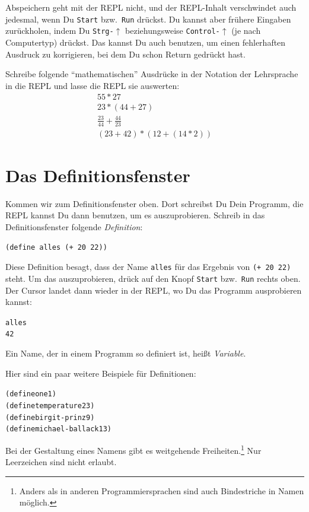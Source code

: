Abspeichern geht mit der REPL nicht, und der REPL-Inhalt verschwindet
auch jedesmal, wenn Du \texttt{Start} bzw.\ \texttt{Run} drückst.  Du
kannst aber frühere Eingaben zurückholen, indem Du
\texttt{Strg-$\uparrow$} beziehungsweise \texttt{Control-$\uparrow$}
(je nach Computertyp) drückst.  Das kannst Du auch benutzen, um einen
fehlerhaften Ausdruck zu korrigieren, bei dem Du schon Return gedrückt hast.

\begin{aufgabe}
  Schreibe folgende "`mathematischen"' Ausdrücke in der Notation der
  Lehrsprache in die REPL und lasse die REPL sie auswerten:
  \begin{displaymath}
    \begin{array}{c}
      55 * 27\\
      23 * (44 + 27)\\
      \frac{23}{44} + \frac{44}{23}\\
      (23 + 42) * (12 + (14 * 2))
    \end{array}
  \end{displaymath}
\end{aufgabe}
%
\section{Das Definitionsfenster}

Kommen wir zum Definitionsfenster oben.  Dort schreibst Du Dein
Programm, die REPL kannst Du dann benutzen, um es auszuprobieren.
Schreib in das Definitionsfenster folgende
\textit{Definition}:
%
\begin{verbatim}
(define alles (+ 20 22))
\end{verbatim}
%
Diese Definition besagt, dass der Name \texttt{alles} für das Ergebnis
von \texttt{(+ 20 22)} steht.  Um das auszuprobieren, drück auf den
Knopf \texttt{Start} bzw.\ \texttt{Run} rechts oben.  Der Cursor
landet dann wieder in der REPL, wo Du das Programm ausprobieren
kannst:
%
\begin{alltt}
alles
\evalsto{} 42
\end{alltt}
%
Ein Name, der in einem Programm so definiert ist, heißt
\textit{Variable}.

Hier sind ein paar weitere Beispiele für Definitionen:
%
\begin{alltt}
(define one 1)
(define temperature 23)
(define birgit-prinz 9)
(define michael-ballack 13)
\end{alltt}
%
Bei der Gestaltung eines Namens gibt es weitgehende
Freiheiten.\footnote{Anders als in anderen Programmiersprachen sind
  auch Bindestriche in Namen möglich.}  Nur Leerzeichen sind nicht
erlaubt.

